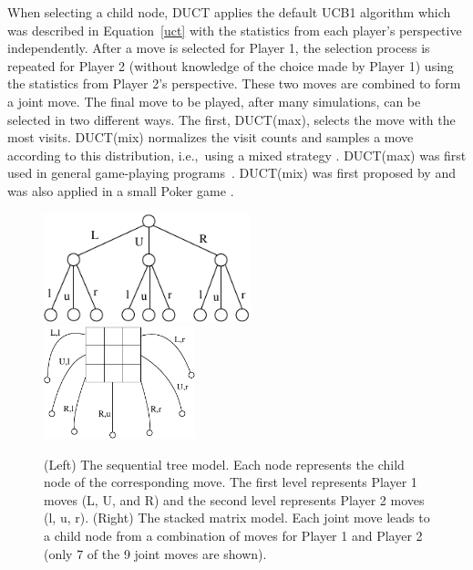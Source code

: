 \documentclass{article}
\newcommand{\ie}{{i.e.,}~}
\begin{document}
When selecting a child node, DUCT applies the default UCB1 algorithm which was described in Equation~\ref{uct} with the statistics from each player's perspective independently. After a move is selected for Player 1, the selection process is repeated for Player 2 (without knowledge of the choice made by Player 1) using the statistics from Player 2's perspective. These two moves are combined to form a joint move.
The final move to be played, after many simulations, can be selected in two different ways. The first, DUCT(max), selects the move with the most visits. 
DUCT(mix) normalizes the visit counts and samples a move according to this distribution, \ie using a mixed strategy \cite{mcts_goofspiel}. 
DUCT(max) was first used in general game-playing programs~\cite{finnson_master}. DUCT(mix) was first proposed by \cite{Shafiei09} and was also applied 
in a small Poker game \cite{Ponsen11Computing}. 

\begin{figure}
\begin{center}
\includegraphics[width=6cm]{seq-model.pdf}~~~~~~~~~~~~~~~\includegraphics[width=4.4cm]{mat-model.pdf}
\caption{(Left) The sequential tree model. Each node represents the child node of the corresponding move. The first level represents Player 1 moves (L, U, and R) and the second level represents Player 2 moves (l, u, r). 
(Right) The stacked matrix model. Each joint move leads to a child node from a combination of moves for Player 1 and Player 2 (only 7 of the 9 joint moves are shown).
\label{fig:suct_vs_duct}}
\end{center}
\end{figure}
\end{document}
